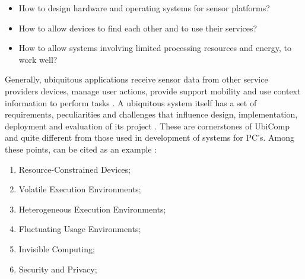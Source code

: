 \documentclass{acm_proc_article-sp}
\begin{document}
\begin{itemize}
\item How to design hardware and operating systems for sensor platforms?
\item How to allow devices to find each other and to use their services?
\item How to allow systems involving limited processing resources and energy, to work well?
\end{itemize}

Generally, ubiquitous applications receive sensor data from other service providers devices, manage user actions, provide support mobility and use context information to perform tasks \cite{doesntfit}. A ubiquitous system itself has a set of requirements, peculiarities and challenges that influence design, implementation, deployment and evaluation of its project \cite{krumm2009}. These are cornerstones of UbiComp and quite different from those used in development of systems for PC's. Among these points, can be cited as an example \cite{krumm2009}:

\begin{enumerate}
\item Resource-Constrained Devices; 	
\item Volatile Execution Environments; 	
\item Heterogeneous Execution Environments;
\item Fluctuating Usage Environments;
\item Invisible Computing;
\item Security and Privacy;
\end{enumerate}
\end{document}
